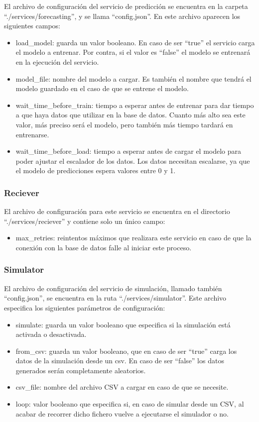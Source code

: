 El archivo de configuración del servicio de predicción se encuentra en la carpeta ``./services/forecasting'', y 
se llama ``config.json''. En este archivo aparecen los siguientes campos:
\begin{itemize}
    \item load\_model: guarda un valor booleano. En caso de ser ``true'' el servicio carga el modelo a entrenar.
        Por contra, si el valor es ``false'' el modelo se entrenará en la ejecución del servicio.
    \item model\_file: nombre del modelo a cargar. Es también el nombre que tendrá el modelo guardado en el caso 
        de que se entrene el modelo.
    \item wait\_time\_before\_train: tiempo a esperar antes de entrenar para dar tiempo a que haya datos que 
        utilizar en la base de datos. Cuanto más alto sea este valor, más preciso será el modelo, pero también
        más tiempo tardará en entrenarse.
    \item wait\_time\_before\_load: tiempo a esperar antes de cargar el modelo para poder ajustar el escalador de los
        datos. Los datos necesitan escalarse, ya que el modelo de predicciones espera valores entre 0 y 1.
\end{itemize}

\subsubsection{Reciever}

El archivo de configuración para este servicio se encuentra en el directorio ``./services/reciever'' y 
contiene solo un único campo:
\begin{itemize}
    \item max\_retries: reintentos máximos que realizara este servicio en caso de que la conexión con 
        la base de datos falle al iniciar este proceso.
\end{itemize}

\subsubsection{Simulator}

El archivo de configuración del servicio de simulación, llamado también ``config.json'', se encuentra en la 
ruta ``./services/simulator''. Este archivo especifica los siguientes parámetros de configuración:
\begin{itemize}
  \item simulate: guarda un valor booleano que especifica si la simulación está activada o desactivada.
  \item from\_csv: guarda un valor booleano, que en caso de ser ``true'' carga los datos de la simulación desde
    un csv. En caso de ser ``false'' los datos generados serán completamente aleatorios.
  \item csv\_file: nombre del archivo CSV a cargar en caso de que se necesite.
  \item loop: valor booleano que especifica si, en caso de simular desde un CSV, al acabar de recorrer dicho fichero 
    vuelve a ejecutarse el simulador o no.
\end{itemize}

